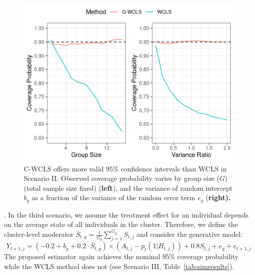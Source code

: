 \documentclass[12pt]{article}
\begin{document}
\begin{figure}[htp]
\centering
\includegraphics[scale=0.75]{Rplot.png}
\caption{C-WCLS offers more valid $95\%$ confidence intervals than WCLS in Scenario II. Observed coverage probability varies by group size  ($G$) (total sample size fixed) ({\bf left}), and the variance of random intercept $b_g$ as a fraction of the variance of the random error term $e_g$ (\bf right).}
    \label{fig:undercoverage}
\end{figure}

.  In the third scenario, we assume the treatment effect for an individual depends on the average state of all individuals in the cluster. Therefore, we define the cluster-level moderator $\bar S_{t,g} = \frac{1}{G_g}\sum_{j=1}^{G_g} S_{t,j}$ and consider the generative model:
\begin{equation*}
Y_{t+1,j} = (-0.2 + b_g +  0.2 \cdot \bar S_{t,g}) \times (A_{t,j} -p_t(1|H_{t,j})) + 0.8 S_{t,j} + e_g + e_{t+1,j}
\end{equation*}
The proposed estimator again achieves the nominal 95\% coverage probability while the WCLS method does not (see Scenario III, Table~\ref{tab:simresults}).
\end{document}
